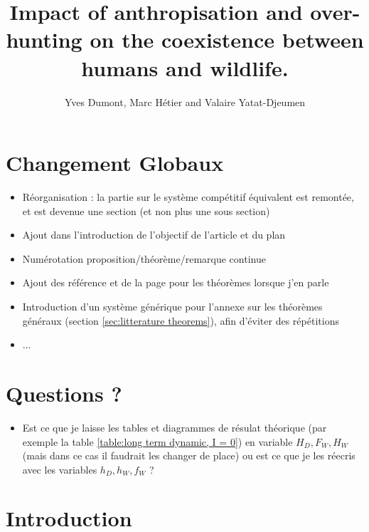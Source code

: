 \documentclass{article}
\title{Impact of anthropisation and over-hunting on the coexistence between humans and wildlife.}
\author{Yves Dumont, Marc Hétier and Valaire Yatat-Djeumen}
\theoremstyle{definition}
\theoremstyle{remark}
\begin{document}
\maketitle
\section*{Changement Globaux}
\begin{itemize}
\item Réorganisation : la partie sur le système compétitif équivalent est remontée, et est devenue une section (et non plus une sous section)
\item Ajout dans l'introduction de l'objectif de l'article et du plan
\item Numérotation proposition/théorème/remarque continue
\item Ajout des référence et de la page pour les théorèmes lorsque j'en parle
\item Introduction d'un système générique pour l'annexe sur les théorèmes généraux (section \ref{sec:litterature theorems}), afin d'éviter des répétitions
\item ...
\end{itemize}

\section*{Questions ?}
\begin{itemize}
\item Est ce que je laisse les tables et diagrammes de résulat théorique (par exemple la table \ref{table:long term dynamic, I = 0}) en variable $H_D, F_W, H_W$ (mais dans ce cas il faudrait les changer de place) ou est ce que je les réecris avec les variables $h_D, h_W, f_W$ ?
\end{itemize}

\section{Introduction}
\end{document}
